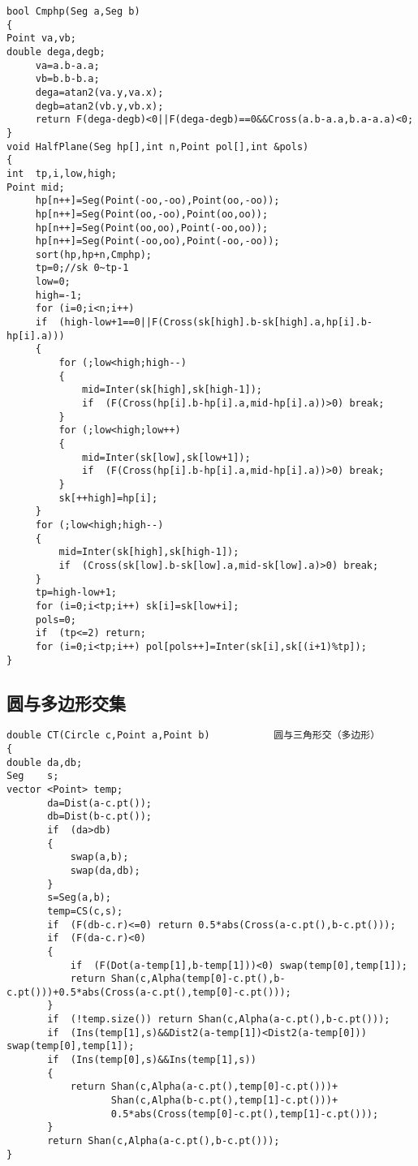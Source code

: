 \documentclass{article}
\begin{document}
\begin{CJK*}{UTF8}{song}
\begin{lstlisting}
bool Cmphp(Seg a,Seg b)
{
Point va,vb;
double dega,degb;
     va=a.b-a.a;
     vb=b.b-b.a;
     dega=atan2(va.y,va.x);
     degb=atan2(vb.y,vb.x);
     return F(dega-degb)<0||F(dega-degb)==0&&Cross(a.b-a.a,b.a-a.a)<0;
}
void HalfPlane(Seg hp[],int n,Point pol[],int &pols)
{
int  tp,i,low,high;
Point mid;
     hp[n++]=Seg(Point(-oo,-oo),Point(oo,-oo));
     hp[n++]=Seg(Point(oo,-oo),Point(oo,oo));
     hp[n++]=Seg(Point(oo,oo),Point(-oo,oo));
     hp[n++]=Seg(Point(-oo,oo),Point(-oo,-oo));
     sort(hp,hp+n,Cmphp);
     tp=0;//sk 0~tp-1
     low=0;
     high=-1;
     for (i=0;i<n;i++)
     if  (high-low+1==0||F(Cross(sk[high].b-sk[high].a,hp[i].b-hp[i].a)))
     {
         for (;low<high;high--)
         {
             mid=Inter(sk[high],sk[high-1]);
             if  (F(Cross(hp[i].b-hp[i].a,mid-hp[i].a))>0) break;
         }
         for (;low<high;low++)
         {
             mid=Inter(sk[low],sk[low+1]);
             if  (F(Cross(hp[i].b-hp[i].a,mid-hp[i].a))>0) break;
         }
         sk[++high]=hp[i];
     }
     for (;low<high;high--)
     {
         mid=Inter(sk[high],sk[high-1]);
         if  (Cross(sk[low].b-sk[low].a,mid-sk[low].a)>0) break;
     }
     tp=high-low+1;
     for (i=0;i<tp;i++) sk[i]=sk[low+i];
     pols=0;
     if  (tp<=2) return;
     for (i=0;i<tp;i++) pol[pols++]=Inter(sk[i],sk[(i+1)%tp]);
}

\end{lstlisting}
\subsection{圆与多边形交集}
\begin{lstlisting}
double CT(Circle c,Point a,Point b)           圆与三角形交（多边形）
{
double da,db;
Seg    s;
vector <Point> temp;
       da=Dist(a-c.pt());
       db=Dist(b-c.pt());
       if  (da>db)
       {
           swap(a,b);
           swap(da,db);
       }
       s=Seg(a,b);
       temp=CS(c,s);
       if  (F(db-c.r)<=0) return 0.5*abs(Cross(a-c.pt(),b-c.pt()));
       if  (F(da-c.r)<0)
       {
           if  (F(Dot(a-temp[1],b-temp[1]))<0) swap(temp[0],temp[1]);
           return Shan(c,Alpha(temp[0]-c.pt(),b-c.pt()))+0.5*abs(Cross(a-c.pt(),temp[0]-c.pt()));
       }
       if  (!temp.size()) return Shan(c,Alpha(a-c.pt(),b-c.pt()));
       if  (Ins(temp[1],s)&&Dist2(a-temp[1])<Dist2(a-temp[0])) swap(temp[0],temp[1]);
       if  (Ins(temp[0],s)&&Ins(temp[1],s))
       {
           return Shan(c,Alpha(a-c.pt(),temp[0]-c.pt()))+
                  Shan(c,Alpha(b-c.pt(),temp[1]-c.pt()))+
                  0.5*abs(Cross(temp[0]-c.pt(),temp[1]-c.pt()));
       }
       return Shan(c,Alpha(a-c.pt(),b-c.pt()));
}
\end{lstlisting}

\end{CJK*}
\end{document}
